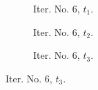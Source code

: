 \documentclass[a4paper,12pt]{amsart}
\numberwithin{equation}{section}
\begin{document}
\begin{figure}[h!]
\begin{subfigure}[t]{0.23\textwidth}
    \caption{Iter. No. 6, $t_1$.}
\end{subfigure}
	\hfill
\begin{subfigure}[t]{0.23\textwidth}
    \caption{Iter. No. 6, $t_2$.}
\end{subfigure}
	\hfill
\begin{subfigure}[t]{0.23\textwidth}
    \caption{Iter. No. 6, $t_3$.}
\end{subfigure}
	

\end{figure}
\end{document}
